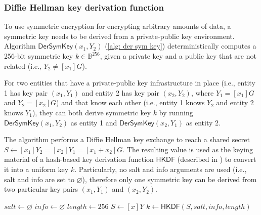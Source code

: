 \clearpage
\subsubsection{Diffie Hellman key derivation function} \label{app: diffie hellman key derivation function}
To use symmetric encryption for encrypting arbitrary amounts of data, a symmetric key needs to be derived from a private-public key environment. Algorithm $\mathsf{DerSymKey}(x_1, Y_2)$ (\cref{alg: der sym key}) deterministically computes a 256-bit symmetric key $k \in \mathbb{B}^{256}$, given a private key and a public key that are not related (i.e., $Y_2 \neq [x_1]G$).

For two entities that have a private-public key infrastructure in place (i.e., entity 1 has key pair $(x_1, Y_1)$ and entity 2 has key pair $(x_2, Y_2)$, where $Y_1 = [x_1]G$ and $Y_2 = [x_2]G$) and that know each other (i.e., entity 1 knows $Y_2$ and entity 2 knows $Y_1$), they can both derive symmetric key $k$ by running $\mathsf{DerSymKey}(x_1, Y_2)$ as entity 1 and $\mathsf{DerSymKey}(x_2, Y_1)$ as entity 2.

The algorithm performs a Diffie Hellman key exchange to reach a shared secret $S \gets [x_1]Y_2 = [x_2]Y_1 = [x_1 + x_2]G$. The resulting value is used as the keying material of a hash-based key derivation function $\mathsf{HKDF}$ (described in \cite{RFC5869}) to convert it into a uniform key $k$. Particularly, no salt and info arguments are used (i.e., salt and info are set to $\varnothing$), therefore only one symmetric key can be derived from two particular key pairs $(x_1, Y_1)$ and $(x_2, Y_2)$.

\begin{algorithm}[ht]
    \DontPrintSemicolon
    \caption{$\mathsf{DerSymKey}(x, Y)$}
    \label{alg: der sym key}
    
    $salt \gets \varnothing$ \;
    $info \gets \varnothing$ \;
    $length \gets 256$ \;
    $S \gets [x]Y$ \;
    $k \gets \mathsf{HKDF}(S, salt, info, length)$ \;
     
\end{algorithm}
